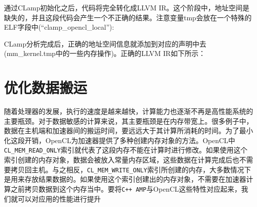 通过CLamp初始化之后，代码将完全转化成LLVM IR。这个阶段中，地址空间是缺失的，并且这段代码会产生一个不正确的结果。注意变量tmp会放在一个特殊的ELF字段中(“clamp\_\allowbreak{}opencl\_\allowbreak{}local”):


CLamp分析完成后，正确的地址空间信息就添加到对应的声明中去(mm\_\allowbreak{}kernel.tmp中的一些内存操作)。正确的LLVM IR如下所示：




\section{优化数据搬运}

随着处理器的发展，执行的速度是越来越快，计算能力也逐渐不再是高性能系统的主要瓶颈。对于数据敏感的计算来说，其主要瓶颈是在内存带宽上。很多例子中，数据在主机端和加速器间的搬运时间，要远远大于其计算所消耗的时间。为了最小化这段开销，OpenCL为加速器提供了多种创建内存对象的方法。OpenCL中\texttt{CL\_MEM\_READ\_ONLY}索引就代表了这段内存不能在计算时进行修改。如果使用这个索引创建的内存对象，数据会被放入常量内存区域，这些数据在计算完成后也不需要拷贝回主机。与之相反，\texttt{CL\_MEM\_WRITE\_ONLY}索引所创建的内存，大多数情况下是用来存放结果数据的。如果使用这个索引创建出的内存对象，不需要在加速器计算之前拷贝数据到这个内存当中。要将\texttt{C++ AMP}与OpenCL这些特性对应起来，我们就可以对应用的性能进行提升

